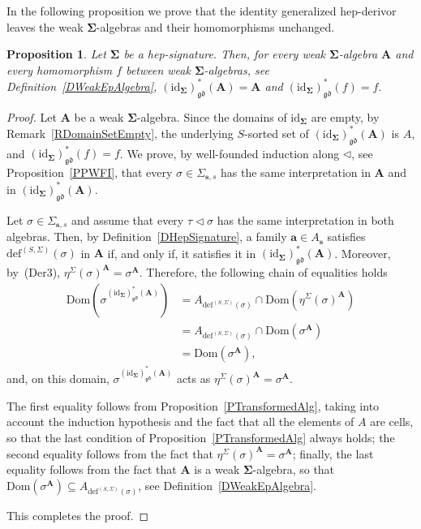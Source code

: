 \documentclass[a4paper, reqno
]{amsart}
\newcommand{\sig}[1]{\mathbf{#1}}             %
\newcommand{\Dom}{\mathrm{Dom}}
\newcommand{\id}{\mathrm{id}}
\newcommand{\gd}{\mathfrak{gd}}              %
\theoremstyle{plain}
\newtheorem{proposition}[theorem]{Proposition}
\theoremstyle{definition}
\begin{document}
In the following proposition we prove that the identity generalized hep-derivor leaves the weak $\sig{\Sigma}$-algebras and their homomorphisms unchanged.

\begin{proposition}\label{PHepId}
Let $\sig{\Sigma}$ be a hep-signature.
Then, for every weak $\sig{\Sigma}$-algebra $\mathbf{A}$ and every homomorphism $f$ between weak $\sig{\Sigma}$-algebras, see Definition~\ref{DWeakEpAlgebra}, $(\id_{\sig{\Sigma}})^{\ast}_{\gd}(\mathbf{A})=\mathbf{A}$ and $(\id_{\sig{\Sigma}})^{\ast}_{\gd}(f)=f$.
\end{proposition}
\begin{proof}
Let $\mathbf{A}$ be a weak $\sig{\Sigma}$-algebra.
Since the domains of $\id_{\sig{\Sigma}}$ are empty, by Remark~\ref{RDomainSetEmpty}, the underlying $S$-sorted set of $(\id_{\sig{\Sigma}})^{\ast}_{\gd}(\mathbf{A})$ is $A$, and $(\id_{\sig{\Sigma}})^{\ast}_{\gd}(f)=f$.
We prove, by well-founded induction along $\lhd$, see Proposition~\ref{PPWFI}, that every $\sigma\in\Sigma_{\mathbf{s},s}$ has the same interpretation in $\mathbf{A}$ and in $(\id_{\sig{\Sigma}})^{\ast}_{\gd}(\mathbf{A})$.

Let $\sigma\in\Sigma_{\mathbf{s},s}$ and assume that every $\tau\lhd\sigma$ has the same interpretation in both algebras.
Then, by Definition~\ref{DHepSignature}, a family $\mathbf{a}\in A_{\mathbf{s}}$ satisfies $\mathrm{def}^{(S,\Sigma)}(\sigma)$ in $\mathbf{A}$ if, and only if, it satisfies it in $(\id_{\sig{\Sigma}})^{\ast}_{\gd}(\mathbf{A})$.
Moreover, by~(Der3), $\eta^{\Sigma}(\sigma)^{\mathbf{A}}=\sigma^{\mathbf{A}}$.
Therefore, the following chain of equalities holds
\begin{align*}
\Dom\left(\sigma^{(\id_{\sig{\Sigma}})^{\ast}_{\gd}(\mathbf{A})}\right)
&=
A_{\mathrm{def}^{(S,\Sigma)}(\sigma)}\cap\Dom\left(\eta^{\Sigma}(\sigma)^{\mathbf{A}}\right)
\tag{1}
\\&=
A_{\mathrm{def}^{(S,\Sigma)}(\sigma)}\cap\Dom\left(\sigma^{\mathbf{A}}\right)
\tag{2}
\\&=
\Dom\left(\sigma^{\mathbf{A}}\right),
\tag{3}
\end{align*}
and, on this domain, $\sigma^{(\id_{\sig{\Sigma}})^{\ast}_{\gd}(\mathbf{A})}$ acts as $\eta^{\Sigma}(\sigma)^{\mathbf{A}}=\sigma^{\mathbf{A}}$.

The first equality follows from Proposition~\ref{PTransformedAlg}, taking into account the induction hypothesis and the fact that all the elements of $A$ are cells, so that the last condition of Proposition~\ref{PTransformedAlg} always holds; the second equality follows from the fact that $\eta^{\Sigma}(\sigma)^{\mathbf{A}}=\sigma^{\mathbf{A}}$; finally, the last equality follows from the fact that $\mathbf{A}$ is a weak $\sig{\Sigma}$-algebra, so that $\Dom(\sigma^{\mathbf{A}})\subseteq A_{\mathrm{def}^{(S,\Sigma)}(\sigma)}$, see Definition~\ref{DWeakEpAlgebra}.

This completes the proof.
\end{proof}
\end{document}
